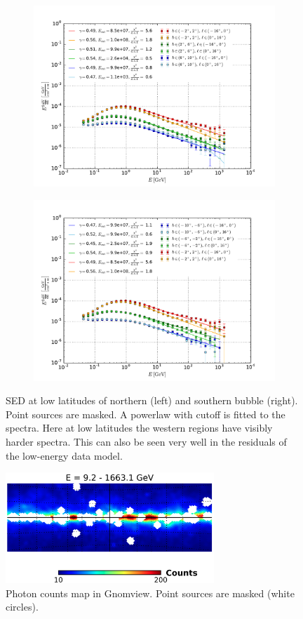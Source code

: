\documentclass[a4paper]{article}
\begin{document}
\begin{figure}
    \begin{subfigure}{0.5\textwidth}
        \includegraphics[width=\textwidth]{SED_top.pdf}
    \end{subfigure} 
    \begin{subfigure}{0.5\textwidth}
        \includegraphics[width=\textwidth]{SED_bottom.pdf}
    \end{subfigure}
    \caption{SED at low latitudes of northern (left) and southern bubble (right). Point sources are masked. A powerlaw with cutoff is fitted to the spectra. Here at low latitudes the western regions have visibly harder spectra. This can also be seen very well in the residuals of the low-energy data model.}
\end{figure}

\begin{figure}
	\centering
    \includegraphics[width = 0.70\textwidth]{Gnomview9-1663GeV}
    \caption{Photon counts map in Gnomview. Point sources are masked (white circles).}
\end{figure} 
\end{document}
